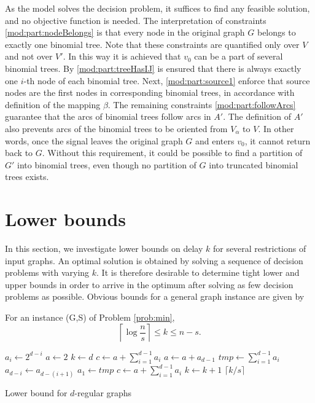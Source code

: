 As the model solves the decision problem, it suffices to find any feasible solution, and no objective function is needed.
The interpretation of constraints \eqref{mod:part:nodeBelongs} is that every node in the original graph $G$ belongs to exactly one binomial tree.
Note that these constraints are quantified only over $V$ and not over $V'$.
In this way it is achieved that $v_0$ can be a part of several binomial trees.
By \eqref{mod:part:treeHasIJ} is ensured that there is always exactly one $i$-th node of each binomial tree.
Next, \eqref{mod:part:source1} enforce that source nodes are the first nodes in corresponding binomial trees, in accordance with definition of the mapping $\beta$.
The remaining constraints \eqref{mod:part:followArcs} guarantee that the arcs of binomial trees follow arcs in $A'$.
The definition of $A'$ also prevents arcs of the binomial trees to be oriented from $V_\alpha$ to $V$.
In other words, once the signal leaves the original graph $G$ and enters $v_0$, it cannot return back to $G$.
Without this requirement, it could be possible to find a partition of $G'$ into binomial trees, even though no partition of $G$ into truncated binomial trees exists.

\section{Lower bounds}
In this section, we investigate lower bounds on delay $k$ for several restrictions of input graphs.
An optimal solution is obtained by solving a sequence of decision problems with varying $k$. 
It is therefore desirable to determine tight lower and upper bounds in order to arrive in the optimum after solving as few decision problems as possible.
Obvious bounds for a general graph instance are given by
\begin{observation}
For an instance (G,S) of Problem \ref{prob:min},
$$\left\lceil\log\frac{n}{s}\right\rceil\leq k \leq n-s.$$
\end{observation}


\begin{algorithm}
 {
$a_i\leftarrow 2^{d-i}$\;
}
$a\leftarrow 2$\;
$k\leftarrow d$\;
$c\leftarrow a + \sum_{i=1}^{d-1}a_i$\;
 {
$a\leftarrow a+a_{d-1}$\;
$tmp\leftarrow\sum_{i=1}^{d-1}a_i$\;
 {
	$a_{d-i}\leftarrow a_{d-(i+1)}$\;
}
$a_1\leftarrow tmp$\;
$c\leftarrow a + \sum_{i=1}^{d-1}a_i$\;
$k\leftarrow k+1$\;
}
\Return $\lceil k/s \rceil$\;
 \caption{Lower bound for $d$-regular graphs}
\label{alg:dreg}
\end{algorithm}


